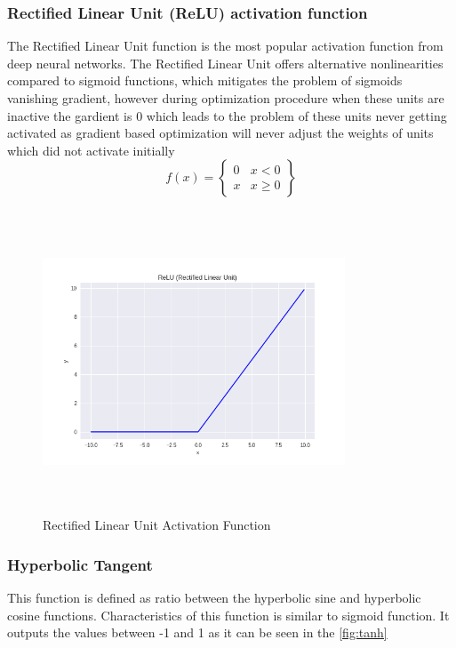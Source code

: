 \subsubsection*{Rectified Linear Unit (ReLU) activation function}
The Rectified Linear Unit function is the most popular activation function from deep neural networks. The Rectified Linear Unit offers alternative nonlinearities compared to sigmoid functions, which mitigates the problem of sigmoids vanishing gradient, however during optimization procedure when these units are inactive the gardient is $0$ which leads to the problem of these units never getting activated as gradient based optimization will never adjust the weights of units which did not activate initially \cite{maas2013rectifier}\\
\begin{equation}\label{eq:ReLU}
f(x) = \begin{Bmatrix}
0 & x < 0 \\ 
x & x \geq 0 
\end{Bmatrix}
\end{equation}
\begin{figure}[h]
\centering
\includegraphics[width=9cm, height=9cm, keepaspectratio]{pics/ReLU_10.png}
\caption{Rectified Linear Unit Activation Function}
\label{fig:ReLU}
\end{figure} 

\subsubsection*{Hyperbolic Tangent}
This function is defined as ratio between the hyperbolic sine and hyperbolic cosine functions. Characteristics of this function is similar to sigmoid function. It outputs the values between -1 and 1 as it can be seen in the \ref{fig:tanh}

